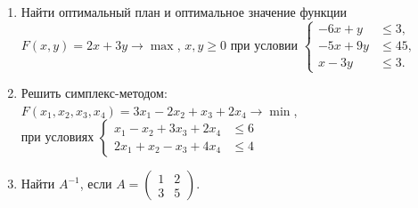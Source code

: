 \documentclass[a5paper,14pt]{extarticle}
\begin{document}
\begin{LOOP}{20}
\begin{enumerate}
\item  Найти оптимальный план и оптимальное значение функции $F(x,y)=2x+3y \to \max$, $x,y\geqslant 0$ при условии
$
\left \lbrace
\begin{aligned}
  -6x+y &\leqslant 3,\\
  -5x+9y &\leqslant 45,\\
  x-3y &\leqslant 3.
\end{aligned}
\right.
$



\item Решить симплекс-методом:\\
$F(x_1, x_2, x_3, x_4) = 3x_1 - 2x_2 + x_3 +2x_4  \to \min$,\\
при условиях 
$
\left\lbrace\begin{aligned}
x_1 - x_2 + 3x_3 + 2x_4 &\leqslant 6\\
2x_1 + x_2 - x_3 + 4x_4 &\leqslant 4
\end{aligned}\right.
$

\item Найти $A^{-1}$, если
$A=\begin{pmatrix}1 & 2\\ 3 & 5\end{pmatrix}$.

\end{enumerate}
\newpage
\end{LOOP}
\end{document}
